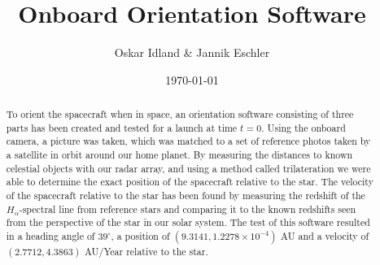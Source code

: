 \documentclass[reprint,english,notitlepage]{revtex4-2}
\begin{document}
\title{Onboard Orientation Software}
\author{Oskar Idland \& Jannik Eschler}
\date{\today}

\begin{abstract}
    To orient the spacecraft when in space, an orientation software consisting of three parts has been created and tested for a launch at time $t = 0$.
	Using the onboard camera, a picture was taken, which was matched to a set of reference photos taken by a satellite in orbit around our home planet.
	By measuring the distances to known celestial objects with our radar array, and using a method called trilateration we were able to determine the exact position of the spacecraft relative to the star.
	The velocity of the spacecraft relative to the star has been found by measuring the redshift of the $H_{\alpha}$-spectral line from reference stars and comparing it to the known redshifts seen from the perspective of the star in our solar system.
	The test of this software resulted in a heading angle of $39^{\circ}$, a position of $(9.3141, 1.2278\times10^{-4})$ AU and a velocity of $(2.7712, 4.3863)$ AU/Year relative to the star.

\end{abstract}
\maketitle
\end{document}
